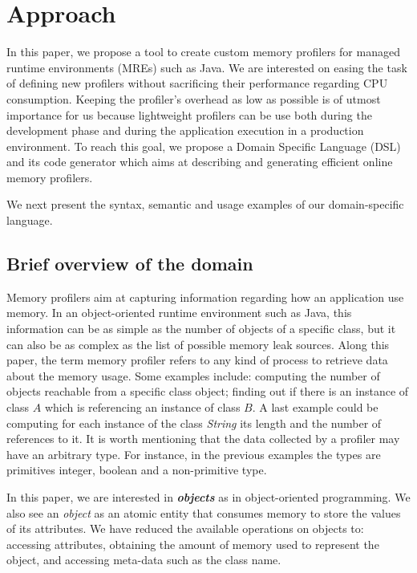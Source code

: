 \section{Approach}\label{sec:approach}

In this paper, we propose a tool to create custom memory profilers for managed runtime environments (MREs) such as Java.
We are interested on easing the task of defining new profilers without sacrificing their performance regarding CPU consumption.
Keeping the profiler's overhead as low as possible is of utmost importance for us because lightweight profilers can be use both during the development phase and during the application execution in a production environment.
To reach this goal, we propose a Domain Specific Language (DSL) and its code generator which aims at describing and generating efficient online memory profilers. 

We next present the syntax, semantic and usage examples of our domain-specific language.


\subsection{Brief overview of the domain}

Memory profilers aim at capturing information regarding how an application use memory.
In an object-oriented runtime environment such as Java, this information can be as simple as the number of objects of a specific class, but it can also be  as complex  as the list of possible memory leak sources.
Along this paper, the term memory profiler refers to any kind of process to retrieve data about the memory usage.
Some examples include: computing the number of objects reachable from a specific class object; finding out if there is an instance of class $A$ which is referencing an instance of class $B$.
A last example could be computing for each instance of the class \textit{String} its length and the number of references to it.
It is worth mentioning that the data collected by a profiler may have an arbitrary type.
For instance, in the previous examples the types are primitives integer, boolean and a non-primitive type.


In this paper, we are interested in \textbf{\textit{objects}} as in object-oriented programming.
We also see an \textit{object} as an atomic entity that consumes memory to store the values of its attributes.
We have  reduced the available operations on objects to: accessing attributes, obtaining the amount of memory used to represent the object, and accessing meta-data such as the class name.

